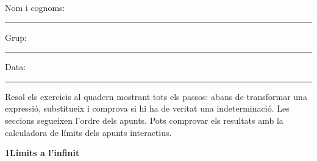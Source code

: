 \documentclass[11pt,a4paper]{article}
\newcounter{exer}
\newcommand{\seccio}[2]{\par\needspace{16\baselineskip}\bigskip
  \begin{tcolorbox}[colback=navy,colframe=navy,coltext=white,arc=2mm,boxrule=0pt,left=3mm,right=3mm,top=1.2mm,bottom=1.2mm]
  {\large\bfseries #1\quad #2}
  \end{tcolorbox}\vspace{-2pt}}
\begin{document}
\thispagestyle{primera}

\vspace{10pt}
Nom i cognoms: \rule{8.4cm}{0.4pt}\hfill Grup: \rule{1.6cm}{0.4pt}\hfill Data: \rule{2.2cm}{0.4pt}
\vspace{8pt}

\begin{tcolorbox}[colback=soft,colframe=soft,arc=2mm,left=3mm,right=3mm,top=1.5mm,bottom=1.5mm]
\small Resol els exercicis al quadern mostrant tots els passos: abans de transformar una expressió, substitueix i comprova si hi ha de veritat una indeterminació. Les seccions segueixen l'ordre dels apunts. Pots comprovar els resultats amb la calculadora de límits dels apunts interactius.
\end{tcolorbox}

\seccio{1}{Límits a l'infinit}
\end{document}
